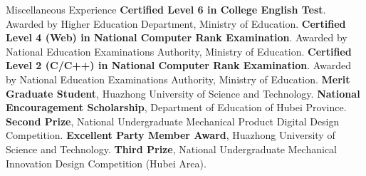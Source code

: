 \begin{rubric}{Miscellaneous Experience}
\entry*[2013] \textbf{Certified Level 6 in College English Test}. Awarded by Higher Education Department, Ministry of Education.
\entry*[2011] \textbf{Certified Level 4 (Web) in National Computer Rank Examination}. Awarded by National Education Examinations Authority, Ministry of Education.
\entry*[2010 ] \textbf{Certified Level 2 (C/C++) in National Computer Rank Examination}. Awarded by National Education Examinations Authority, Ministry of Education.
%
\entry*[2013] \textbf{Merit Graduate Student}, Huazhong University of Science and Technology.
\entry*[2011] \textbf{National Encouragement Scholarship}, Department of Education of Hubei Province.
\entry*[    ] \textbf{Second Prize}, National Undergraduate Mechanical Product Digital Design Competition.
\entry*[2010] \textbf{Excellent Party Member Award}, Huazhong University of Science and Technology.
\entry*[    ] \textbf{Third Prize}, National Undergraduate Mechanical Innovation Design Competition (Hubei Area).


\end{rubric}